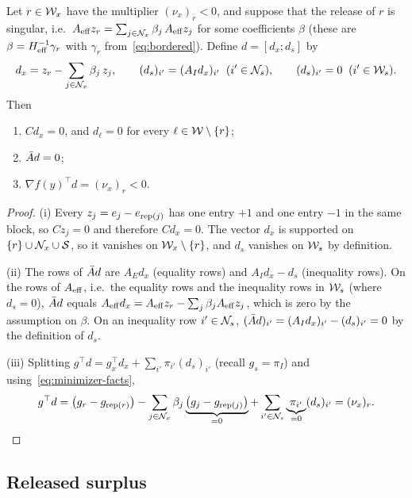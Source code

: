 \begin{theorem} \label{thm:zc-column}
Let $r\in\mathcal{W}_x$ have the multiplier $(\nu_x)_r<0$, and suppose that the release of $r$ is
singular, i.e.\ $A_{\mathrm{eff}} z_r = \sum_{j\in\mathcal{N}_x}\beta_j\,A_{\mathrm{eff}} z_j$ for some coefficients $\beta$
(these are $\beta = H_{\mathrm{eff}}^{-1}\gamma_r$ with $\gamma_r$ from~\eqref{eq:bordered}). Define
$d = [d_x; d_s]$ by
\begin{equation} \label{eq:zc-column}
d_x = z_r - \sum_{j\in\mathcal{N}_x}\beta_j\,z_j,\qquad
(d_s)_{i'} = (A_Id_x)_{i'}\;\;(i'\in\mathcal{N}_s),\qquad (d_s)_{i'} = 0\;\;(i'\in\mathcal{W}_s).
\end{equation}
Then
\begin{enumerate}
    \item \label{thm:zc-column:i} $Cd_x = 0$, and $d_\ell = 0$ for every $\ell\in\mathcal{W}\setminus\{r\}$;
    \item \label{thm:zc-column:ii} $\bar{A} d = 0$;
    \item \label{thm:zc-column:iii} $\nabla f(y)^\top d = (\nu_x)_r < 0$.
\end{enumerate}
\end{theorem}

\begin{proof}
(i) Every $z_j = e_j - e_{\operatorname{rep}(j)}$ has one entry $+1$ and one entry $-1$ in the same block, so
$Cz_j = 0$ and therefore $Cd_x = 0$. The vector $d_x$ is supported on $\{r\}\cup\mathcal{N}_x\cup\mathcal{S}$, so it
vanishes on $\mathcal{W}_x\setminus\{r\}$, and $d_s$ vanishes on $\mathcal{W}_s$ by definition.

(ii) The rows of $\bar{A} d$ are $A_Ed_x$ (equality rows) and $A_Id_x - d_s$ (inequality rows). On
the rows of $A_{\mathrm{eff}}$, i.e.\ the equality rows and the inequality rows in $\mathcal{W}_s$ (where $d_s = 0$),
$\bar{A} d$ equals $A_{\mathrm{eff}} d_x = A_{\mathrm{eff}} z_r - \sum_j\beta_jA_{\mathrm{eff}} z_j$, which is zero by the assumption on
$\beta$. On an inequality row $i'\in\mathcal{N}_s$, $(\bar{A} d)_{i'} = (A_Id_x)_{i'} - (d_s)_{i'} = 0$ by the
definition of $d_s$.

(iii) Splitting $g^\top d = g_x^\top d_x + \sum_{i'}\pi_{i'}(d_s)_{i'}$ (recall $g_s = \pi_I$) and
using~\eqref{eq:minimizer-facts},
\[
g^\top d = \bigl(g_r - g_{\operatorname{rep}(r)}\bigr) - \sum_{j\in\mathcal{N}_x}\beta_j\underbrace{\bigl(g_j - g_{\operatorname{rep}(j)}\bigr)}_{=0}
+ \sum_{i'\in\mathcal{N}_s}\underbrace{\pi_{i'}}_{=0}(d_s)_{i'} = (\nu_x)_r . \qedhere
\]
\end{proof}

\subsection{Released surplus}

